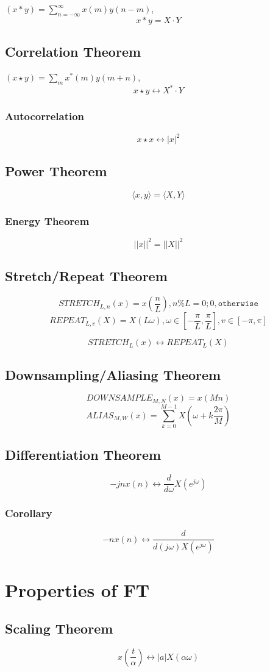 \documentclass[11pt]{article}
\begin{document}
$(x * y) = \sum_{n=-\infty}^{\infty} x(m) y(n-m)$,
\[x * y = X \cdot Y\]

\subsection*{Correlation Theorem} \indent

$(x \star y) = \sum_m x^*(m) y(m+n)$,
\[x \star y \leftrightarrow X^* \cdot Y\]

\subsubsection*{Autocorrelation} \indent

\[x \star x \leftrightarrow |x|^2\]

\subsection*{Power Theorem} \indent

\[\langle x, y\rangle = \langle X, Y\rangle\]

\subsubsection*{Energy Theorem} \indent

\[||x||^2 = ||X||^2\]

\subsection*{Stretch/Repeat Theorem} \indent

\[STRETCH_{L, n}(x) = x(\frac{n}{L}), n \% L = 0; 0, \texttt{otherwise}\]
\[REPEAT_{L, v}(X) = X(L\omega), \omega \in [-\frac{\pi}{L}, \frac{\pi}{L}], v \in [-\pi, \pi]\]

\[STRETCH_L(x) \leftrightarrow REPEAT_L(X)\]

\subsection*{Downsampling/Aliasing Theorem} \indent

\[DOWNSAMPLE_{M, N}(x) = x(Mn)\]
\[ALIAS_{M, W}(x) = \sum_{k=0}^{M-1} X(\omega + k\frac{2\pi}{M})\]

\subsection*{Differentiation Theorem} \indent

\[-jn x(n) \leftrightarrow \frac{d}{d\omega}X(e^{j\omega})\]

\subsubsection*{Corollary}

\[-n x(n) \leftrightarrow \frac{d}{d(j\omega)X(e^{j\omega})}\]

\section*{Properties of FT} \indent

\subsection*{Scaling Theorem}

\[x(\frac{t}{\alpha}) \leftrightarrow |a|X(\alpha\omega)\]
\end{document}

